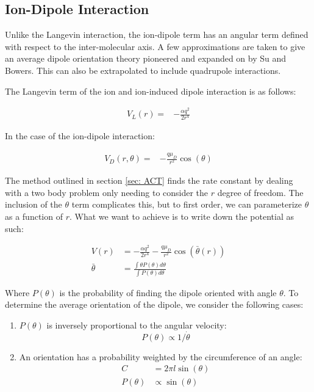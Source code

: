 \subsection{Ion-Dipole Interaction}

Unlike the Langevin interaction, the ion-dipole term has an angular term defined with respect to the inter-molecular axis. A few approximations are taken to give an average dipole orientation theory pioneered and expanded on by Su and Bowers.\cite{Su1973, Su1973a} This can also be extrapolated to include quadrupole interactions.\cite{Su1975}

The Langevin term of the ion and ion-induced dipole interaction is as follows:

\begin{align}
	V_L(r)= &-\frac{\alpha q^2}{2r^4}
\end{align}

In the case of the ion-dipole interaction:

\begin{align}
	V_D(r, \theta) = & -\frac{q\mu_D}{r^2} \cos(\theta)
\end{align}

The method outlined in section \ref{sec: ACT} finds the rate constant by dealing with a two body problem only needing to consider the $r$ degree of freedom. The inclusion of the $\theta$ term complicates this, but to first order, we can parameterize $\theta$ as a function of $r$. What we want to achieve is to write down the potential as such:

\begin{align}
    V(r) & = -\frac{\alpha q^2}{2r^4} - \frac{q\mu_D}{r^2} \cos\left(\bar{\theta}(r)\right) \nonumber \\
    \bar{\theta} & = \frac{\int \theta P(\theta) d\theta}{\int P(\theta) d\theta} \label{eq: avg theta}
\end{align}

Where $P(\theta)$ is the probability of finding the dipole oriented with angle $\theta$. To determine the average orientation of the dipole, we consider the following cases:

\begin{enumerate}
	\item $P(\theta)$ is inversely proportional to the angular velocity:
	\begin{equation*}
		P(\theta) \propto 1/\dot{\theta}
	\end{equation*}
	\item An orientation has a probability weighted by the circumference of an angle:
	\begin{align*}
		C & = 2\pi l \sin(\theta) \\
		P(\theta) & \propto \sin(\theta)
	\end{align*}
\end{enumerate}

